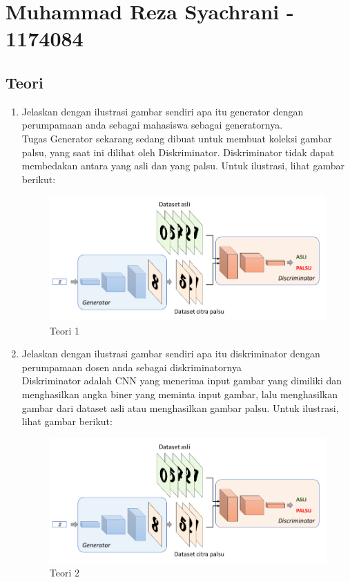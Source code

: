 \section{Muhammad Reza Syachrani - 1174084}
\subsection{Teori}
\begin{enumerate}

	\item Jelaskan dengan ilustrasi gambar sendiri apa itu generator dengan perumpamaan anda sebagai mahasiswa sebagai generatornya.
	\hfill\\
Tugas Generator sekarang sedang dibuat untuk membuat koleksi gambar palsu, yang saat ini dilihat oleh Diskriminator. Diskriminator tidak dapat membedakan antara yang asli dan yang palsu. Untuk ilustrasi, lihat gambar berikut:

\begin{figure}[H]
    \includegraphics[width=12cm]{figures/1174084/8/teori1.png}
    \centering
    \caption{Teori 1}
\end{figure}

\item Jelaskan dengan ilustrasi gambar sendiri apa itu diskriminator dengan perumpamaan dosen anda sebagai diskriminatornya
	\hfill\\
	Diskriminator adalah CNN yang menerima input gambar yang dimiliki dan menghasilkan angka biner yang meminta input gambar, lalu menghasilkan gambar dari dataset asli atau menghasilkan gambar palsu. Untuk ilustrasi, lihat gambar berikut:  

\begin{figure}[H]
    \includegraphics[width=12cm]{figures/1174084/8/teori1.png}
    \centering
    \caption{Teori 2}
\end{figure}


\end{enumerate}
